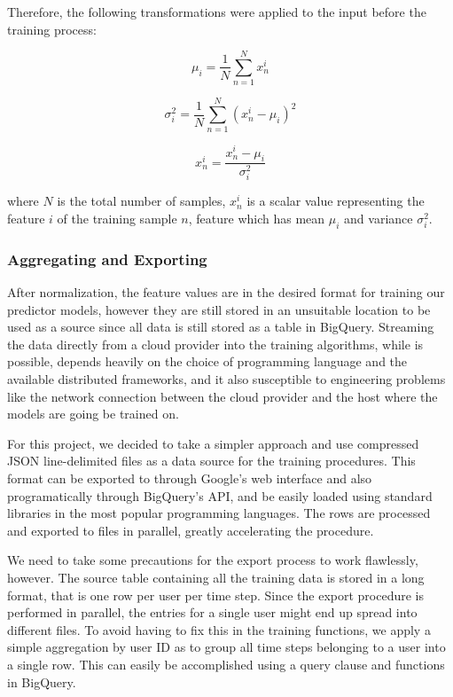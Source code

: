 \documentclass{kththesis}
\begin{document}
Therefore, the following transformations were applied to the input before the training process:

 \begin{equation}
 \mu_i = \frac{1}{N}\sum_{n=1}^{N}x_n^i
 \end{equation}

\begin{equation}
\sigma_i^2 = \frac{1}{N}\sum_{n=1}^{N}(x_n^i - \mu_i)^2
\end{equation}
 
\begin{equation}
x_n^i = \frac{x_n^i - \mu_i}{\sigma_i^2}
\end{equation}

where $N$ is the total number of samples, $x_n^i$ is a scalar value representing the feature $i$ of the training sample $n$, feature which has mean $\mu_i$ and variance $\sigma^2_i$.

\subsubsection{Aggregating and Exporting}

After normalization, the feature values are in the desired format for training our predictor models, however they are still stored in an unsuitable location to be used as a source since all data is still stored as a table in BigQuery. Streaming the data directly from a cloud provider into the training algorithms, while is possible, depends heavily on the choice of programming language and the available distributed frameworks, and it also susceptible to engineering problems like the network connection between the cloud provider and the host where the models are going be trained on.

For this project, we decided to take a simpler approach and use compressed JSON line-delimited files as a data source for the training procedures. This format can be exported to through Google's web interface and also programatically through BigQuery's API, and be easily loaded using standard libraries in the most popular programming languages. The rows are processed and exported to files in parallel, greatly accelerating the procedure.

We need to take some precautions for the export process to work flawlessly, however. The source table containing all the training data is stored in a long format, that is one row per user per time step. Since the export procedure is performed in parallel, the entries for a single user might end up spread into different files. To avoid having to fix this in the training functions, we apply a simple aggregation by user ID as to group all time steps belonging to a user into a single row. This can easily be accomplished using a query clause and functions in BigQuery.
\end{document}

